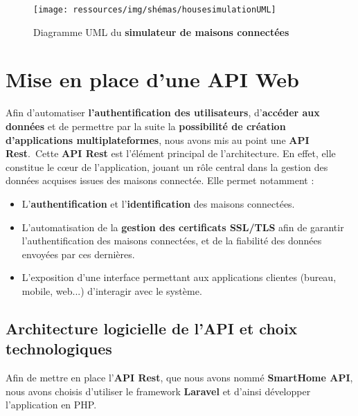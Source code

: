 \documentclass[10pt, a4paper]{report}
\begin{document}
		\begin{figure}[h!]
		\centering
		\texttt{[image: ressources/img/shémas/housesimulationUML]}
		\caption{Diagramme UML du \textbf{simulateur de maisons connectées}}
		\label{fig:umlMaisonConnectées}
		\end{figure}
	
	\section{Mise en place d'une API Web}
	Afin d'automatiser \textbf{l'authentification des utilisateurs}, d'\textbf{accéder aux données} et de permettre par la suite la \textbf{possibilité de création d'applications multiplateformes}, nous avons mis au point une \textbf{API Rest}.\
	Cette \textbf{API Rest} est l'élément principal de l'architecture. En effet, elle constitue le cœur de l’application, jouant un rôle central dans la gestion des données acquises issues des maisons connectée. Elle permet notamment :

	\begin{itemize}
		\item L’\textbf{authentification} et l’\textbf{identification} des maisons connectées.
		\item L’automatisation de la \textbf{gestion des certificats SSL/TLS} afin de garantir l'authentification des maisons connectées, et de la fiabilité des données envoyées par ces dernières.
		\item L’exposition d’une interface permettant aux applications clientes (bureau, mobile, web...) d’interagir avec le système.
	\end{itemize} 

	\subsection{Architecture logicielle de l'API et choix technologiques}
	
	Afin de mettre en place l'\textbf{API Rest}, que nous avons nommé \textbf{SmartHome API}, nous avons choisis d'utiliser le framework \textbf{Laravel} et d'ainsi développer l'application en PHP.
	
\end{document}

